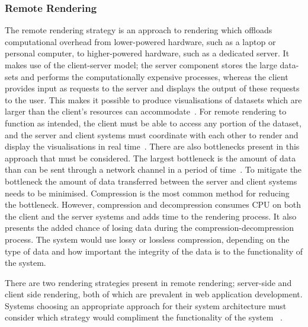\subsubsection{Remote Rendering}
The remote rendering strategy is an approach to rendering which offloads computational overhead from lower-powered hardware, such as a laptop or personal computer, to higher-powered hardware, such as a dedicated server.
It makes use of the client-server model;
the server component stores the large data-sets and performs the computationally expensive processes,
whereas the client provides input as requests to the server and displays the output of these requests to the user.
This makes it possible to produce visualisations of datasets which are larger than the client's resources can accommodate~\cite{Hassan2011}.
For remote rendering to function as intended, the client must be able to access any portion of the dataset, and the server and client systems must coordinate with each other to render and display the visualisations in real time~\cite{Glueck2014}.
There are also bottlenecks present in this approach that must be considered.
The largest bottleneck is the amount of data than can be sent through a network channel in a period of time~\cite{Abidi2017}.
To mitigate the bottleneck the amount of data transferred between the server and client systems needs to be minimised.
Compression is the most common method for reducing the bottleneck.
However, compression and decompression consumes CPU on both the client and the server systems and adds time to the rendering process.
It also presents the added chance of losing data during the compression-decompression process.
The system would use lossy or lossless compression, depending on the type of data and how important the integrity of the data is to the functionality of the system.

There are two rendering strategies present in remote rendering; server-side and client side rendering, both of which are prevalent in web application development.
Systems choosing an appropriate approach for their system architecture must consider which strategy would compliment the functionality of the system ~\cite{Iskandar2020}.


